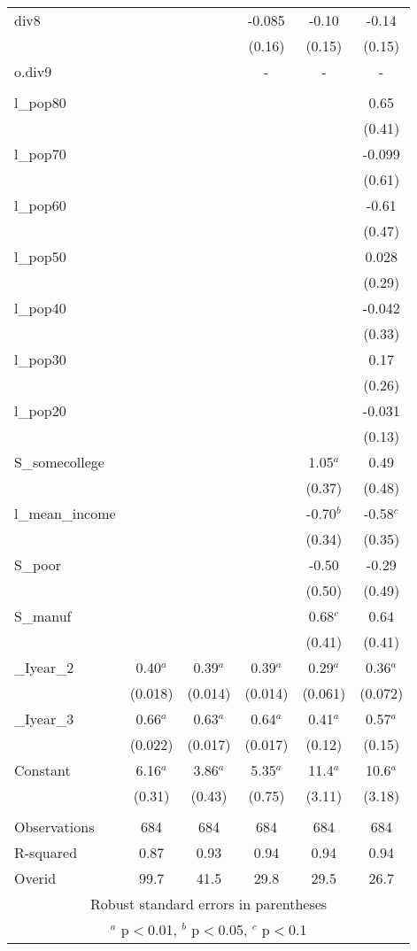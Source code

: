 \documentclass[]{article}
\begin{document}
\begin{tabular}{lccccc}
div8 &  &  & -0.085 & -0.10 & -0.14 \\
 &  &  & (0.16) & (0.15) & (0.15) \\
o.div9 &  &  & - & - & - \\
 &  &  &  &  &  \\
l\_pop80 &  &  &  &  & 0.65 \\
 &  &  &  &  & (0.41) \\
l\_pop70 &  &  &  &  & -0.099 \\
 &  &  &  &  & (0.61) \\
l\_pop60 &  &  &  &  & -0.61 \\
 &  &  &  &  & (0.47) \\
l\_pop50 &  &  &  &  & 0.028 \\
 &  &  &  &  & (0.29) \\
l\_pop40 &  &  &  &  & -0.042 \\
 &  &  &  &  & (0.33) \\
l\_pop30 &  &  &  &  & 0.17 \\
 &  &  &  &  & (0.26) \\
l\_pop20 &  &  &  &  & -0.031 \\
 &  &  &  &  & (0.13) \\
S\_somecollege &  &  &  & 1.05$^a$ & 0.49 \\
 &  &  &  & (0.37) & (0.48) \\
l\_mean\_income &  &  &  & -0.70$^b$ & -0.58$^c$ \\
 &  &  &  & (0.34) & (0.35) \\
S\_poor &  &  &  & -0.50 & -0.29 \\
 &  &  &  & (0.50) & (0.49) \\
S\_manuf &  &  &  & 0.68$^c$ & 0.64 \\
 &  &  &  & (0.41) & (0.41) \\
\_Iyear\_2 & 0.40$^a$ & 0.39$^a$ & 0.39$^a$ & 0.29$^a$ & 0.36$^a$ \\
 & (0.018) & (0.014) & (0.014) & (0.061) & (0.072) \\
\_Iyear\_3 & 0.66$^a$ & 0.63$^a$ & 0.64$^a$ & 0.41$^a$ & 0.57$^a$ \\
 & (0.022) & (0.017) & (0.017) & (0.12) & (0.15) \\
Constant & 6.16$^a$ & 3.86$^a$ & 5.35$^a$ & 11.4$^a$ & 10.6$^a$ \\
 & (0.31) & (0.43) & (0.75) & (3.11) & (3.18) \\
 &  &  &  &  &  \\
Observations & 684 & 684 & 684 & 684 & 684 \\
R-squared & 0.87 & 0.93 & 0.94 & 0.94 & 0.94 \\
 Overid & 99.7 & 41.5 & 29.8 & 29.5 & 26.7 \\ \hline
\multicolumn{6}{c}{ Robust standard errors in parentheses} \\
\multicolumn{6}{c}{ $^a$ p$<$0.01, $^b$ p$<$0.05, $^c$ p$<$0.1} \\
\end{tabular}
\end{document}
